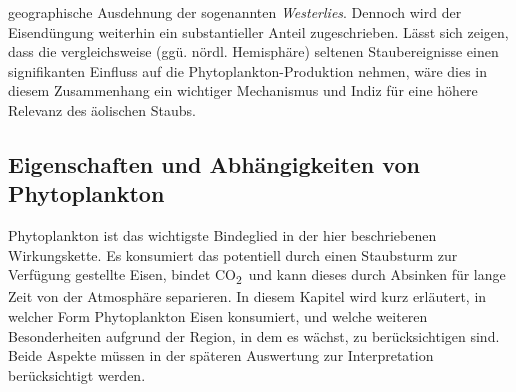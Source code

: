 \documentclass[12pt,a4paper,onecolumn]{scrartcl}
\newcommand{\cotwo}{CO\textsubscript{2}}
\begin{document}
geographische Ausdehnung der sogenannten \textit{Westerlies}. Dennoch wird der Eisendüngung weiterhin ein substantieller Anteil zugeschrieben. Lässt sich zeigen, dass die vergleichsweise (ggü. nördl. Hemisphäre) seltenen Staubereignisse einen signifikanten Einfluss auf die Phytoplankton-Produktion nehmen, wäre dies in diesem Zusammenhang ein wichtiger Mechanismus und Indiz für eine höhere Relevanz des äolischen Staubs.
\subsection{Eigenschaften und Abhängigkeiten von Phytoplankton} \label{sec:Phytoplankton}
Phytoplankton ist das wichtigste Bindeglied in der hier beschriebenen Wirkungskette. Es konsumiert das potentiell durch einen Staubsturm zur Verfügung gestellte Eisen, bindet \cotwo \ und kann dieses durch Absinken für lange Zeit von der Atmosphäre separieren. In diesem Kapitel wird kurz erläutert, in welcher Form Phytoplankton Eisen konsumiert, und 
welche weiteren Besonderheiten aufgrund der Region, in dem es wächst, zu berücksichtigen sind. Beide Aspekte müssen in der späteren Auswertung zur Interpretation berücksichtigt werden.
\end{document}
